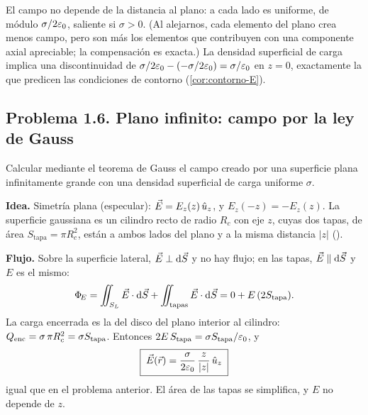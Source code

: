 \begin{observacion}
El campo no depende de la distancia al plano: a cada lado es uniforme, de módulo $\sigma/2\varepsilon_{0}$, saliente si $\sigma>0$. (Al alejarnos, cada elemento del plano crea menos campo, pero son más los elementos que contribuyen con una componente axial apreciable; la compensación es exacta.) La densidad superficial de carga implica una discontinuidad de $\sigma/2\varepsilon_{0}-(-\sigma/2\varepsilon_{0})=\sigma/\varepsilon_{0}$ en $z=0$, exactamente la que predicen las condiciones de contorno (\cref{cor:contorno-E}).
\end{observacion}

\subsection{Problema 1.6. Plano infinito: campo por la ley de Gauss}\label{sem:plano-gauss}
\begin{ejercicio}\label{ejer:plano-gauss}
Calcular mediante el teorema de Gauss el campo creado por una superficie plana infinitamente grande con una densidad superficial de carga uniforme $\sigma$.
\end{ejercicio}

\begin{resolucion}
\textbf{Idea.} Simetría plana (especular): $\vec{E}=E_z(z)\,\hat{u}_{z}$, y $E_z(-z)=-E_z(z)$. La superficie gaussiana es un cilindro recto de radio $R_c$ con eje $z$, cuyas dos tapas, de área $S_{\mathrm{tapa}}=\pi R_c^{2}$, están a ambos lados del plano y a la misma
distancia $\lvert z\rvert$ ().

\textbf{Flujo.} Sobre la superficie lateral, $\vec{E}\perp\mathrm{d}\vec{S}$ y no hay flujo; en las tapas, $\vec{E}\parallel\mathrm{d}\vec{S}$ y $E$ es el mismo:
\[
  \Phi_{\!E}=\iint_{S_L}\vec{E}\cdot\mathrm{d}\vec{S}+\iint_{\text{tapas}}\vec{E}\cdot\mathrm{d}\vec{S}=0+E\,(2S_{\mathrm{tapa}}).
\]
La carga encerrada es la del disco del plano interior al cilindro: $Q_{\mathrm{enc}}=\sigma\,\pi R_c^{2}=\sigma S_{\mathrm{tapa}}$. Entonces $2E\,S_{\mathrm{tapa}}=\sigma S_{\mathrm{tapa}}/\varepsilon_{0}$, y
\[
  \boxed{\;\vec{E}(\vec{r})=\frac{\sigma}{2\varepsilon_{0}}\,\frac{z}{\lvert z\rvert}\,\hat{u}_{z}\;}
\]
igual que en el problema anterior. El área de las tapas se simplifica, y $E$ no depende de $z$.
\end{resolucion}



